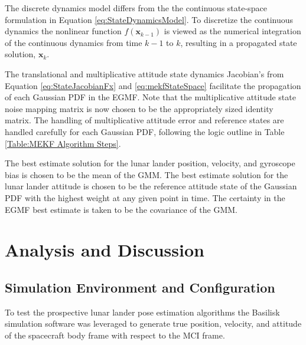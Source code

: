 \documentclass[conf]{new-aiaa}
\newcommand{\vect}[1]{\mathbf{#1}}
\begin{document}
The discrete dynamics model differs from the the continuous state-space formulation in Equation \ref{eq:StateDynamicsModel}. To discretize the continuous dynamics the nonlinear function $f(\vect{x}_{k-1})$ is viewed as the numerical integration of the continuous dynamics from time $k-1$ to $k$, resulting in a propagated state solution, $\vect{x}_{k}$.

The translational and multiplicative attitude state dynamics Jacobian's from Equation \ref{eq:StateJacobianFx} and \ref{eq:mekfStateSpace} facilitate the propagation of each Gaussian PDF in the EGMF. Note that the multiplicative attitude state noise mapping matrix is now chosen to be the appropriately sized identity matrix. The handling of multiplicative attitude error and reference states are handled carefully for each Gaussian PDF, following the logic outline in Table \ref{Table:MEKF Algorithm Steps}.

The best estimate solution for the lunar lander position, velocity, and gyroscope bias is chosen to be the mean of the GMM. The best estimate solution for the lunar lander attitude is chosen to be the reference attitude state of the Gaussian PDF with the highest weight at any given point in time. The certainty in the EGMF best estimate is taken to be the covariance of the GMM.



\section{Analysis and Discussion}
\subsection{Simulation Environment and Configuration}
To test the prospective lunar lander pose estimation algorithms the Basilisk \cite{kenneally2020basilisk} simulation software was leveraged to generate true position, velocity, and attitude of the spacecraft body frame with respect to the MCI frame. 
\end{document}
